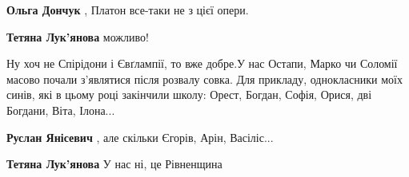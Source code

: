 \begin{itemize}
\begin{itemize}
 
\textbf{Ольга Дончук} , Платон все-таки не з цієї опери.

 
\textbf{Тетяна Лук'янова} можливо!
\end{itemize}

 

Ну хоч не Спірідони і Євґлампії, то вже добре.\Laughey[1.0][white] У нас Остапи, Марко чи Соломії
масово почали з'являтися після розвалу совка. Для прикладу, однокласники моїх
синів, які в цьому році закінчили школу: Орест, Богдан, Софія, Орися, дві
Богдани, Віта, Ілона...

\begin{itemize}
 
\textbf{Руслан Янісевич} , але скільки Єгорів, Арін, Васіліс...

 
\textbf{Тетяна Лук'янова} У нас ні, це Рівненщина

 

\end{itemize}
\end{itemize}

